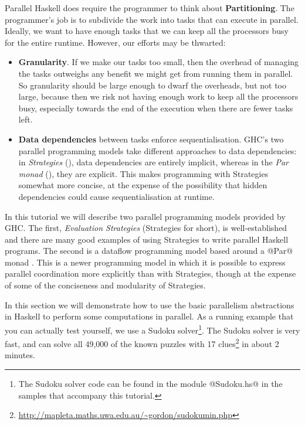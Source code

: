 Parallel Haskell does require the programmer to think about
\textbf{Partitioning}.  The programmer's job is to subdivide the work
into tasks that can execute in parallel.  Ideally, we want to have
enough tasks that we can keep all the processors busy for the entire
runtime.  However, our efforts may be thwarted:
  \begin{itemize}
    \item \textbf{Granularity}.  If we make our tasks too small, then
      the overhead of managing the tasks outweighs any benefit we
      might get from running them in parallel.  So granularity should
      be large enough to dwarf the overheads, but not too large,
      because then we risk not having enough work to keep all the
      processors busy, especially towards the end of the execution
      when there are fewer tasks left.
    \item \textbf{Data dependencies} between tasks enforce
      sequentialisation.  GHC's two parallel programming models take
      different approaches to data dependencies: in \emph{Strategies}
      (), data dependencies are entirely implicit,
      whereas in the \emph{Par monad} (), they are
      explicit.  This makes programming with Strategies somewhat more
      concise, at the expense of the possibility that hidden
      dependencies could cause sequentialisation at runtime.
  \end{itemize}


In this tutorial we will describe two parallel programming models
provided by GHC.  The first, \emph{Evaluation Strategies}
\cite{seq-no-more} (Strategies for short), is well-established and
there are many good examples of using Strategies to write parallel
Haskell programs.  The second is a dataflow programming model based
around a @Par@ monad \cite{monad-par}.  This is a newer programming
model in which it is possible to express parallel coordination more
explicitly than with Strategies, though at the expense of some of the
conciseness and modularity of Strategies.


In this section we will demonstrate how to use the basic parallelism
abstractions in Haskell to perform some computations in parallel.  As
a running example that you can actually test yourself, we use a Sudoku
solver\footnote{The Sudoku solver code can be found in the module
  @Sudoku.hs@ in the samples that accompany this tutorial.}.  The
Sudoku solver is very fast, and can solve all 49,000 of the known
puzzles with 17
clues\footnote{\url{http://mapleta.maths.uwa.edu.au/~gordon/sudokumin.php}}
in about 2 minutes.


